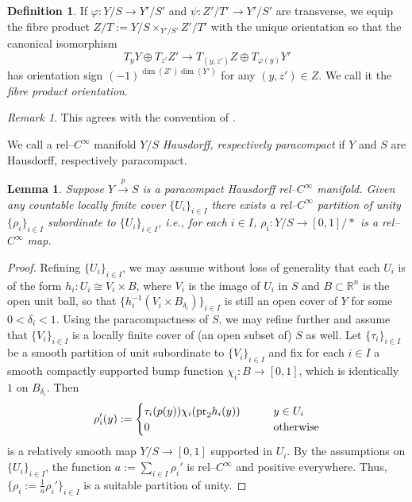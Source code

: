 \documentclass[11pt,psamsfonts, oneside, reqno]{amsart}
\newcommand{\sub}{\subset}%
\newcommand{\s}[2]{\sum\limits_{#1}{#2} }
\newcommand{\inv}{^{-1}}
\newcommand{\cl}{\colon}
\newcommand{\iI}{_{i \in I}}
\newcommand{\xra}{\xrightarrow}
\newcommand{\pr}{\normalfont\text{pr}}
\newcommand{\bR}{\mathbb{R}}
\newtheorem{lemma}[theorem]{Lemma}
\theoremstyle{definition}
\newtheorem{definition}[theorem]{Definition}
\theoremstyle{remark}
\newtheorem{remark}[theorem]{Remark}
\numberwithin{equation}{section}
\begin{document}
\begin{definition}\label{de:orientation-fibre-product} If $\varphi \cl Y/S\to Y'/S'$ and $\psi \cl Z'/T'\to Y'/S'$ are transverse, we equip the fibre product $Z/T:= Y/S\times_{Y'/S'} Z'/T'$ with the unique orientation so that the canonical isomorphism 
	$$T_y Y\oplus T_{z'}Z' \to T_{(y,z')}Z \oplus T_{\varphi(y)}Y'$$
	has orientation sign $(-1)^{\dim(Z')\dim(Y')}$ for any $(y,z')\in Z$. We call it the \emph{fibre product orientation}.
\end{definition}

\begin{remark}\label{}This agrees with the convention of \cite{ST23b}. \end{remark}

\noindent
We call a rel--$C^\infty$ manifold $Y/S$ \emph{Hausdorff, respectively paracompact} if $Y$ and $S$ are Hausdorff, respectively paracompact.

\begin{lemma}\label{lem:partition-of-unity} Suppose $Y\xra{p}S$ is a paracompact Hausdorff rel--$C^\infty$ manifold. Given any countable locally finite cover $\{U_i\}\iI$ there exists a rel--$C^\infty$ partition of unity $\{\rho_i\}\iI$ subordinate to $\{U_i\}\iI$, i.e., for each $i \in I$, $\rho_i\cl Y/S\to [0,1]/*$ is a rel--$C^\infty$ map.
\end{lemma}

\begin{proof} Refining $\{U_i\}\iI$, we may assume without loss of generality that each $U_i$ is of the form $h_i : U_i \cong V_i \times B$, where $V_i$ is the image of $U_i$ in $S$ and $B\sub \bR^n$ is the open unit ball, so that $\{h_i\inv(V_i\times B_{\delta_i})\}\iI$ is still an open cover of $Y$ for some $0 < \delta_i < 1$. Using the paracompactness of $S$, we may refine further and assume that $\{V_i\}\iI$ is a locally finite cover of (an open subset of) $S$ as well. Let $\{\tau_i\}\iI$ be a smooth partition of unit subordinate to $\{V_i\}\iI$ and fix for each $i \in I$ a smooth compactly supported bump function $\chi_i \cl B\to [0,1]$, which is identically $1$ on $B_{\delta_i}$. Then 
	$$\rho'_i(y) := \begin{cases}
		\tau_i(p(y))\chi_i(\pr_2 h_i(y))\qquad & y \in U_i\\
		0 \quad & \text{otherwise}
	\end{cases}$$ 
	is a relatively smooth map $Y/S\to [0,1]$ supported in $U_i$. By the assumptions on $\{U_i\}\iI$, the function $a := \s{i\in I}{\rho_i'}$ is rel--$C^\infty$ and positive everywhere. Thus, $\{\rho_i := \frac{1}{a}\rho_i'\}\iI$ is a suitable partition of unity.
\end{proof}
\end{document}
